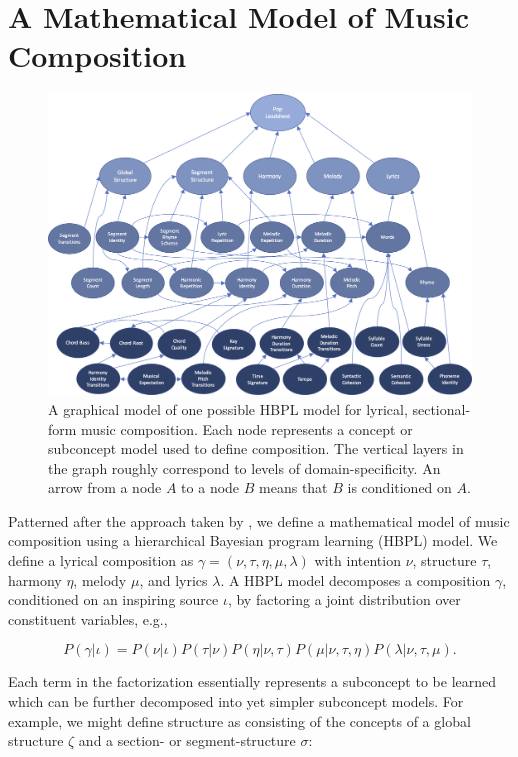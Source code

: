 \documentclass[letterpaper]{article}
\begin{document}
\section{A Mathematical Model of Music Composition}
\begin{figure}[th]
	\centering
	\includegraphics[width=.8\linewidth]{pop_hbpl_gradient}
	\caption{\label{fig:pop_hbpl_gradient} A graphical model of one possible HBPL model for lyrical, sectional-form music composition. Each node represents a concept or subconcept model used to define composition. The vertical layers in the graph roughly correspond to levels of domain-specificity. An arrow from a node $A$ to a node $B$ means that $B$ is conditioned on $A$.}
\end{figure}

Patterned after the approach taken by \citeauthor{lake2015human} , we define a mathematical model of music composition using a hierarchical Bayesian program learning (HBPL) model. We define a lyrical composition as $\gamma=(\nu,\tau,\eta,\mu,\lambda)$ with intention $\nu$, structure $\tau$, harmony $\eta$, melody $\mu$, and lyrics $\lambda$. A HBPL model decomposes a composition $\gamma$, conditioned on an inspiring source $\iota$, by factoring a joint distribution over constituent variables, e.g.,

\[ P(\gamma|\iota) = P(\nu|\iota)P(\tau|\nu)P(\eta|\nu,\tau)P(\mu|\nu,\tau,\eta)P(\lambda|\nu,\tau,\mu). \] 

\noindent Each term in the factorization essentially represents a subconcept to be learned which can be further decomposed into yet simpler subconcept models. For example, we might define structure as consisting of the concepts of a global structure $\zeta$ and a section- or segment-structure $\sigma$:
\end{document}
